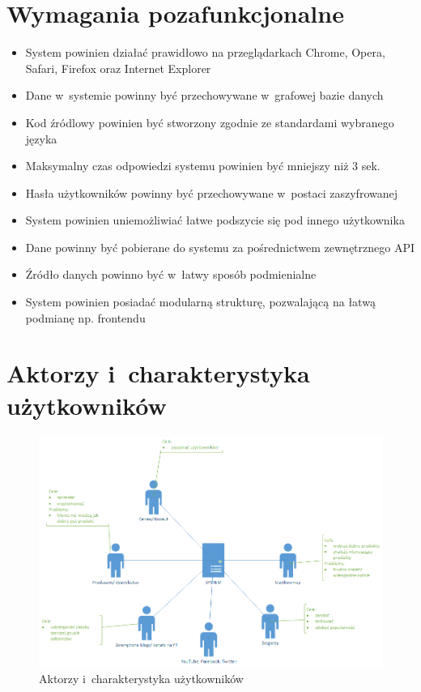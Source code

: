 \section{Wymagania pozafunkcjonalne}
\begin{itemize}
\item System powinien działać prawidłowo na przeglądarkach Chrome, Opera, Safari, Firefox oraz Internet Explorer
\item Dane w~systemie powinny być przechowywane w~grafowej bazie danych
\item Kod źródlowy powinien być stworzony zgodnie ze standardami wybranego języka
\item Maksymalny czas odpowiedzi systemu powinien być mniejszy niż 3 sek.
\item Hasła użytkowników powinny być przechowywane w~postaci zaszyfrowanej
\item System powinien uniemożliwiać łatwe podszycie się pod innego użytkownika 
\item Dane powinny być pobierane do systemu za pośrednictwem zewnętrznego API
\item Źródło danych powinno być w~łatwy sposób podmienialne
\item System powinien posiadać modularną strukturę, pozwalającą na łatwą podmianę np. frontendu
\end{itemize}

\section{Aktorzy i~charakterystyka użytkowników}
\begin{figure}[H]
	\centering
	\includegraphics[width=\textwidth, keepaspectratio=true]{images/Strony_cele.png}
	\caption{Aktorzy i~charakterystyka użytkowników}
\end{figure}
